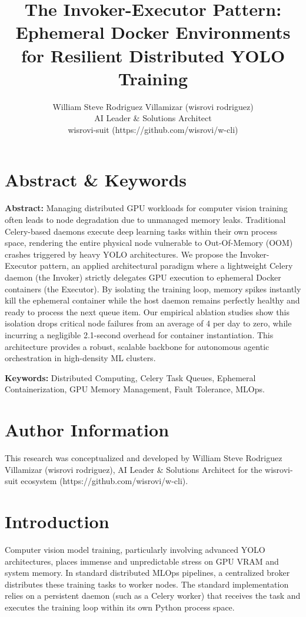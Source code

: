 \documentclass[10pt,twocolumn,letterpaper]{article}
\title{The Invoker-Executor Pattern: Ephemeral Docker Environments for Resilient Distributed YOLO Training}
\author{William Steve Rodriguez Villamizar (wisrovi rodriguez)\\AI Leader \& Solutions Architect\\wisrovi-suit (https://github.com/wisrovi/w-cli)}
\date{}
\begin{document}
\maketitle

\section{Abstract \& Keywords}
\textbf{Abstract:} Managing distributed GPU workloads for computer vision training often leads to node degradation due to unmanaged memory leaks. Traditional Celery-based daemons execute deep learning tasks within their own process space, rendering the entire physical node vulnerable to Out-Of-Memory (OOM) crashes triggered by heavy YOLO architectures. We propose the Invoker-Executor pattern, an applied architectural paradigm where a lightweight Celery daemon (the Invoker) strictly delegates GPU execution to ephemeral Docker containers (the Executor). By isolating the training loop, memory spikes instantly kill the ephemeral container while the host daemon remains perfectly healthy and ready to process the next queue item. Our empirical ablation studies show this isolation drops critical node failures from an average of 4 per day to zero, while incurring a negligible 2.1-second overhead for container instantiation. This architecture provides a robust, scalable backbone for autonomous agentic orchestration in high-density ML clusters.

\textbf{Keywords:} Distributed Computing, Celery Task Queues, Ephemeral Containerization, GPU Memory Management, Fault Tolerance, MLOps.

\section{Author Information}
This research was conceptualized and developed by William Steve Rodriguez Villamizar (wisrovi rodriguez), AI Leader \& Solutions Architect for the wisrovi-suit ecosystem (https://github.com/wisrovi/w-cli).

\section{Introduction}
Computer vision model training, particularly involving advanced YOLO architectures, places immense and unpredictable stress on GPU VRAM and system memory. In standard distributed MLOps pipelines, a centralized broker distributes these training tasks to worker nodes. The standard implementation relies on a persistent daemon (such as a Celery worker) that receives the task and executes the training loop within its own Python process space.
\end{document}
